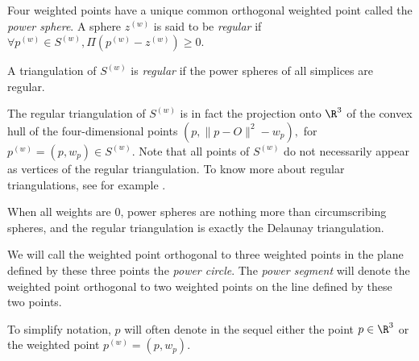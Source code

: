 Four weighted points have a unique common orthogonal weighted point called
the \textit{power sphere}. A sphere ${z}^{(w)}$ is said to be
\textit{regular} if $\forall {p}^{(w)}\in{S}^{(w)},
\Pi{({p}^{(w)}-{z}^{(w)})}\geq 0$.

A triangulation of ${S}^{(w)}$ is \textit{regular} if the power spheres
of all simplices are regular. 

The regular triangulation of
${S}^{(w)}$ is in fact the projection onto $\R^3$ of the convex hull 
of the four-dimensional points $(p,\|p-O\|^2-w_p),$ for
${p}^{(w)}=(p,w_p)\in{S}^{(w)}$. 
Note that all points of ${S}^{(w)}$ do not
necessarily appear as vertices of the regular
triangulation. To know more about regular triangulations, see for
example \cite{es-itfwr-96}. 

When all weights are 0, power spheres are nothing more than
circumscribing spheres, and the regular triangulation is exactly the
Delaunay triangulation.

We will call the weighted point orthogonal to three weighted points in
the plane defined by these three points the \textit{power circle}. The
\textit{power segment} will denote the weighted point orthogonal to
two weighted points on the line defined by these two points.

To simplify notation, $p$ will often denote in the sequel either the
point $p\in\R^3$ or the weighted point ${p}^{(w)}=(p,w_p)$.







